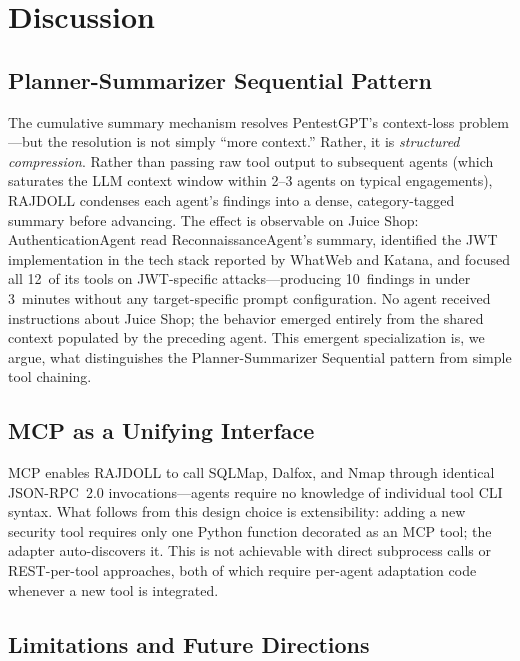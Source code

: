 \documentclass[conference]{IEEEtran}
\begin{document}
\section{Discussion}

\subsection{Planner-Summarizer Sequential Pattern}

The cumulative summary mechanism resolves PentestGPT's
context-loss problem---but the resolution is not simply
``more context.'' Rather, it is \textit{structured compression}.
Rather than passing raw tool output to subsequent agents (which
saturates the LLM context window within 2--3 agents on typical
engagements), RAJDOLL condenses each agent's findings into a
dense, category-tagged summary before advancing. The effect is
observable on Juice Shop: AuthenticationAgent read
ReconnaissanceAgent's summary, identified the JWT implementation
in the tech stack reported by WhatWeb and Katana, and focused
all 12~of its tools on JWT-specific attacks---producing 10~findings
in under 3~minutes without any target-specific prompt
configuration. No agent received instructions about Juice Shop;
the behavior emerged entirely from the shared context populated
by the preceding agent. This emergent specialization is, we
argue, what distinguishes the Planner-Summarizer Sequential
pattern from simple tool chaining.

\subsection{MCP as a Unifying Interface}

MCP enables RAJDOLL to call SQLMap, Dalfox, and Nmap through
identical JSON-RPC~2.0 invocations---agents require no knowledge
of individual tool CLI syntax. What follows from this design
choice is extensibility: adding a new security tool requires only
one Python function decorated as an MCP tool; the adapter
auto-discovers it. This is not achievable with direct subprocess
calls or REST-per-tool approaches, both of which require
per-agent adaptation code whenever a new tool is integrated.

\subsection{Limitations and Future Directions}
\end{document}
